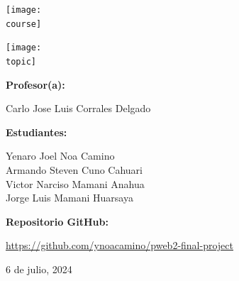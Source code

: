 \documentclass[10pt, a4paper]{article}
\newcommand{\course}{img/web_programming.png}
\newcommand{\topic}{img/django_react.png}
\newcommand{\professor}{Carlo Jose Luis Corrales Delgado}
\newcommand{\students}{Yenaro Joel Noa Camino\\Armando Steven Cuno Cahuari\\Victor Narciso Mamani Anahua\\Jorge Luis Mamani Huarsaya}
\newcommand{\github}{https://github.com/ynoacamino/pweb2-final-project}
\newcommand{\mydate}{6 de julio, 2024}
\begin{document}
\begin{titlepage}
	\centering
	\texttt{[image: \\course]} \par
  \vfill \vfill
	\texttt{[image: \\topic]}\par
  \vfill \vfill
  {\textbf{Profesor(a):} \par}
	\professor \vfill
  {\textbf{Estudiantes:} \par}
	\students \vfill
  {\textbf{Repositorio GitHub:} \par}
  \href{\github}{\github} \vfill
	{\large \mydate \par}
\end{titlepage}


% 

\end{document}
